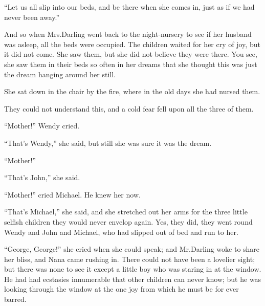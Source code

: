 “Let us all slip into our beds, and be there when she comes in,
just as if we had never been away.”

And so when Mrs.\@ Darling went back to the night-nursery to see if her husband was asleep,
all the beds were occupied.
The children waited for her cry of joy, but it did not come.
She saw them, but she did not believe they were there.
You see, she saw them in their beds so often in her dreams
that she thought this was just the dream hanging around her still.

She sat down in the chair by the fire, where in the old days she had nursed them.

They could not understand this, and a cold fear fell upon all the three of them.

“Mother!\@” Wendy cried.

“That’s Wendy,” she said, but still she was sure it was the dream.

“Mother!”

“That’s John,” she said.

“Mother!\@” cried Michael.
He knew her now.

“That’s Michael,” she said,
and she stretched out her arms for the three little selfish children they would never envelop again.
Yes, they did, they went round Wendy and John and Michael, who had slipped out of bed and run to her.

“George, George!\@” she cried when she could speak;
and Mr.\@ Darling woke to share her bliss, and Nana came rushing in.
There could not have been a lovelier sight;
but there was none to see it except a little boy who was staring in at the window.
He had had ecstasies innumerable that other children can never know;
but he was looking through the window at the one joy from which he must be for ever barred.

\endinput
